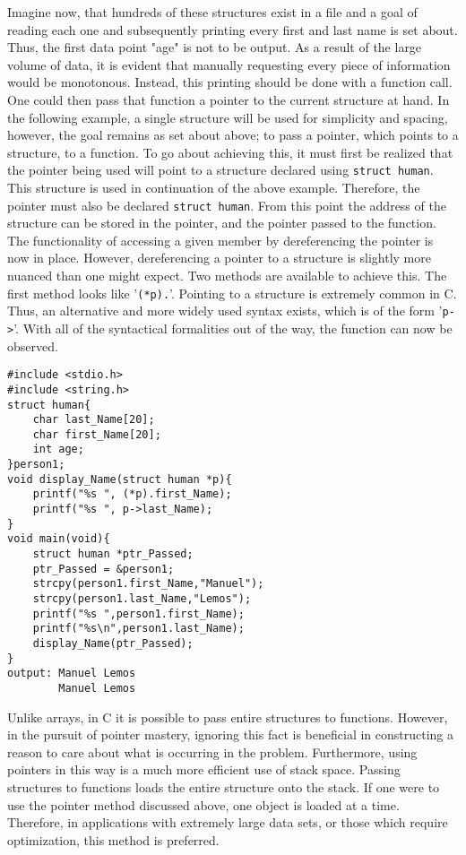 \documentclass[two column, 10pt]{article}
\begin{document}
Imagine now, that hundreds of these structures exist in a file and a goal of reading each one and subsequently printing every first and last name is set about. Thus, the first data point "age" is not to be output. As a result of the large volume of data, it is evident that manually requesting every piece of information would be monotonous. Instead, this printing should be done with a function call. One could then pass that function a pointer to the current structure at hand. In the following example, a single structure will be used for simplicity and spacing, however, the goal remains as set about above; to pass a pointer, which points to a structure, to a function. To go about achieving this, it must first be realized that the pointer being used will point to a structure declared using \lstinline{struct human}. This structure is used in continuation of the above example. Therefore, the pointer must also be declared \lstinline{struct human}. From this point the address of the structure can be stored in the pointer, and the pointer passed to the function. The functionality of accessing a given member by dereferencing the pointer is now in place. However, dereferencing a pointer to a structure is slightly more nuanced than one might expect. Two methods are available to achieve this. The first method looks like '\lstinline{(*p).}'. Pointing to a structure is extremely common in C. Thus, an alternative and more widely used syntax exists, which is of the form '\lstinline{p->}'. With all of the syntactical formalities out of the way, the function can now be observed. 
\begin{lstlisting}[style=CStyle,
caption={Passing a Structure to a Function},captionpos=b]
#include <stdio.h>
#include <string.h>
struct human{
    char last_Name[20];
    char first_Name[20];
    int age;
}person1;
void display_Name(struct human *p){
    printf("%s ", (*p).first_Name);
    printf("%s ", p->last_Name);
}
void main(void){
    struct human *ptr_Passed;
    ptr_Passed = &person1;
    strcpy(person1.first_Name,"Manuel");
    strcpy(person1.last_Name,"Lemos");
    printf("%s ",person1.first_Name);
    printf("%s\n",person1.last_Name);
    display_Name(ptr_Passed);
}
output: Manuel Lemos
        Manuel Lemos
\end{lstlisting}
Unlike arrays, in C it is possible to pass entire structures to functions\cite{T.Jenson}. However, in the pursuit of pointer mastery, ignoring this fact is beneficial in constructing a reason to care about what is occurring in the problem. Furthermore, using pointers in this way is a much more efficient use of stack space. Passing structures to functions loads the entire structure onto the stack. If one were to use the pointer method discussed above, one object is loaded at a time. Therefore, in applications with extremely large data sets, or those which require optimization, this method is preferred.
\end{document}
